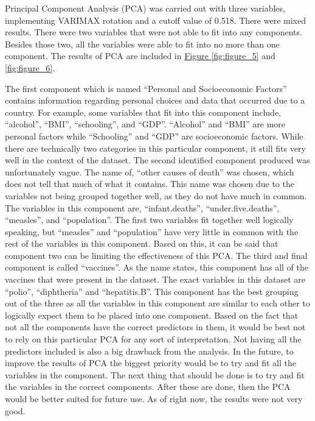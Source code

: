 \documentclass[12pt]{article}
\begin{document}
\begin{multicols}{2}
Principal Component Analysis (PCA) was carried out with three variables, implementing VARIMAX rotation and a cutoff value of 0.518. There were mixed results. There were two variables that were not able to fit into any components. Besides those two, all the variables were able to fit into no more than one component. The results of PCA are included in \hyperref[fig:figure_5]{Figure \ref{fig:figure_5}} and \ref{fig:figure_6}.

The first component which is named “Personal and Socioeconomic Factors” contains information regarding personal choices and data that occurred due to a country. For example, some variables that fit into this component include, “alcohol”, “BMI”, “schooling”, and “GDP”. “Alcohol” and “BMI” are more personal factors while “Schooling” and “GDP” are socioeconomic factors. While there are technically two categories in this particular component, it still fits very well in the context of the dataset. The second identified component produced was unfortunately vague. The name of, “other causes of death” was chosen, which does not tell that much of what it contains. This name was chosen due to the variables not being grouped together well, as they do not have much in common. The variables in this component are, “infant.deaths”, “under.five.deaths”, “measles”, and “population”. The first two variables fit together well logically speaking, but “measles” and “population” have very little in common with the rest of the variables in this component. Based on this, it can be said that component two can be limiting the effectiveness of this PCA.
The third and final component is called “vaccines”. As the name states, this component has all of the vaccines that were present in the dataset. The exact variables in this dataset are “polio”, “diphtheria” and “hepatitis.B”. This component has the best grouping out of the three as all the variables in this component are similar to each other to logically expect them to be placed into one component. Based on the fact that not all the components have the correct predictors in them, it would be best not to rely on this particular PCA for any sort of interpretation. Not having all the predictors included is also a big drawback from the analysis. In the future, to improve the results of PCA the biggest priority would be to try and fit all the variables in the component. The next thing that should be done is to try and fit the variables in the correct components. After these are done, then the PCA would be better suited for future use. As of right now, the results were not very good.


\end{multicols}
\end{document}
